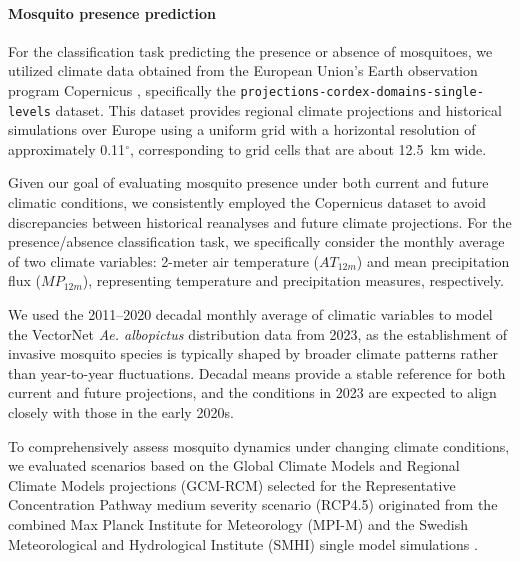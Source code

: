 \documentclass[preprint,12pt]{elsarticle}
\begin{document}
\paragraph{Mosquito presence prediction}

For the classification task predicting the presence or absence of mosquitoes, we utilized climate data obtained from the European Union's Earth observation program Copernicus \cite{copernicus_2025}, specifically the \texttt{projections-cordex-domains-single-levels} dataset. 
This dataset provides regional climate projections and historical simulations over Europe using a uniform grid with a horizontal resolution of approximately 0.11$^\circ$, corresponding to grid cells that are about 12.5~km wide.

Given our goal of evaluating mosquito presence under both current and future climatic conditions, we consistently employed the Copernicus dataset to avoid discrepancies between historical reanalyses and future climate projections. For the presence/absence classification task, we specifically consider the monthly average of two climate variables: 2-meter air temperature ($AT_{12m}$) and mean precipitation flux ($MP_{12m}$), representing temperature and precipitation measures, respectively.

We used the 2011–2020 decadal monthly average of climatic variables to model the VectorNet \emph{Ae. albopictus} distribution data from 2023, as the establishment of invasive mosquito species is typically shaped by broader climate patterns rather than year-to-year fluctuations. Decadal means provide a stable reference for both current and future projections, and the conditions in 2023 are expected to align closely with those in the early 2020s.


To comprehensively assess mosquito dynamics under changing climate conditions, we evaluated scenarios based on the Global Climate Models and Regional Climate Models projections (GCM-RCM) selected for the Representative Concentration Pathway medium severity scenario (RCP4.5) originated from the combined Max Planck Institute for Meteorology (MPI-M) and the Swedish Meteorological and Hydrological Institute (SMHI) single model simulations \cite{vanVuuren2011}.
\end{document}
